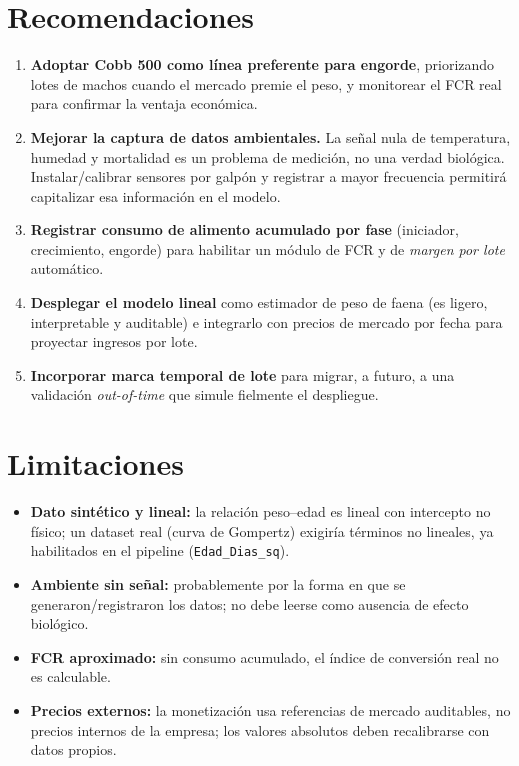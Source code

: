\documentclass[11pt,a4paper]{article}
\begin{document}
\section{Recomendaciones}

\begin{enumerate}[leftmargin=1.5em,itemsep=4pt]
  \item \textbf{Adoptar Cobb 500 como línea preferente para engorde}, priorizando lotes de machos cuando
        el mercado premie el peso, y monitorear el FCR real para confirmar la ventaja económica.
  \item \textbf{Mejorar la captura de datos ambientales.} La señal nula de temperatura, humedad y
        mortalidad es un problema de medición, no una verdad biológica. Instalar/calibrar sensores por
        galpón y registrar a mayor frecuencia permitirá capitalizar esa información en el modelo.
  \item \textbf{Registrar consumo de alimento acumulado por fase} (iniciador, crecimiento, engorde) para
        habilitar un módulo de FCR y de \emph{margen por lote} automático.
  \item \textbf{Desplegar el modelo lineal} como estimador de peso de faena (es ligero, interpretable y
        auditable) e integrarlo con precios de mercado por fecha para proyectar ingresos por lote.
  \item \textbf{Incorporar marca temporal de lote} para migrar, a futuro, a una validación
        \emph{out-of-time} que simule fielmente el despliegue.
\end{enumerate}

\section{Limitaciones}
\begin{itemize}[leftmargin=1.4em,itemsep=2pt]
  \item \textbf{Dato sintético y lineal:} la relación peso--edad es lineal con intercepto no físico; un
        dataset real (curva de Gompertz) exigiría términos no lineales, ya habilitados en el pipeline
        (\texttt{Edad\_Dias\_sq}).
  \item \textbf{Ambiente sin señal:} probablemente por la forma en que se generaron/registraron los datos;
        no debe leerse como ausencia de efecto biológico.
  \item \textbf{FCR aproximado:} sin consumo acumulado, el índice de conversión real no es calculable.
  \item \textbf{Precios externos:} la monetización usa referencias de mercado auditables, no precios
        internos de la empresa; los valores absolutos deben recalibrarse con datos propios.
\end{itemize}
\end{document}

